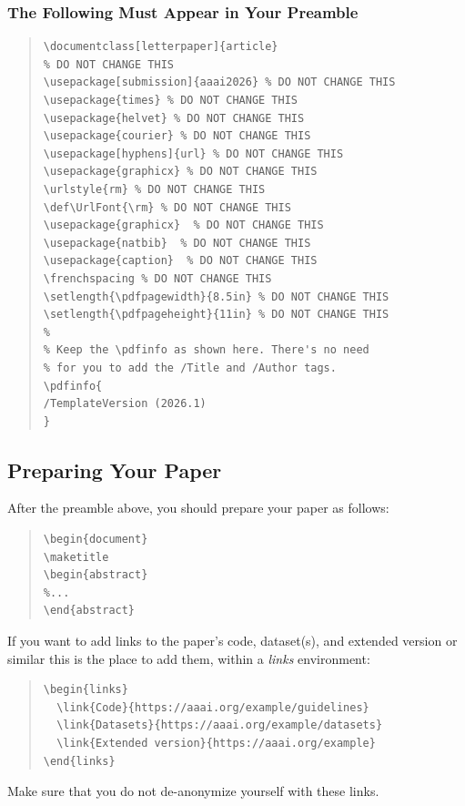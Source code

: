 \documentclass[letterpaper]{article} %
\def\UrlFont{\rm}  %
\begin{document}
\subsubsection{The Following Must Appear in Your Preamble}
\begin{quote}
\begin{scriptsize}\begin{verbatim}
\documentclass[letterpaper]{article}
% DO NOT CHANGE THIS
\usepackage[submission]{aaai2026} % DO NOT CHANGE THIS
\usepackage{times} % DO NOT CHANGE THIS
\usepackage{helvet} % DO NOT CHANGE THIS
\usepackage{courier} % DO NOT CHANGE THIS
\usepackage[hyphens]{url} % DO NOT CHANGE THIS
\usepackage{graphicx} % DO NOT CHANGE THIS
\urlstyle{rm} % DO NOT CHANGE THIS
\def\UrlFont{\rm} % DO NOT CHANGE THIS
\usepackage{graphicx}  % DO NOT CHANGE THIS
\usepackage{natbib}  % DO NOT CHANGE THIS
\usepackage{caption}  % DO NOT CHANGE THIS
\frenchspacing % DO NOT CHANGE THIS
\setlength{\pdfpagewidth}{8.5in} % DO NOT CHANGE THIS
\setlength{\pdfpageheight}{11in} % DO NOT CHANGE THIS
%
% Keep the \pdfinfo as shown here. There's no need
% for you to add the /Title and /Author tags.
\pdfinfo{
/TemplateVersion (2026.1)
}
\end{verbatim}\end{scriptsize}
\end{quote}

\subsection{Preparing Your Paper}

After the preamble above, you should prepare your paper as follows:
\begin{quote}
\begin{scriptsize}\begin{verbatim}
\begin{document}
\maketitle
\begin{abstract}
%...
\end{abstract}\end{verbatim}\end{scriptsize}
\end{quote}

\noindent If you want to add links to the paper's code, dataset(s), and extended version or similar this is the place to add them, within a \emph{links} environment:
\begin{quote}%
\begin{scriptsize}\begin{verbatim}
\begin{links}
  \link{Code}{https://aaai.org/example/guidelines}
  \link{Datasets}{https://aaai.org/example/datasets}
  \link{Extended version}{https://aaai.org/example}
\end{links}\end{verbatim}\end{scriptsize}
\end{quote}
\noindent Make sure that you do not de-anonymize yourself with these links.
\end{document}
